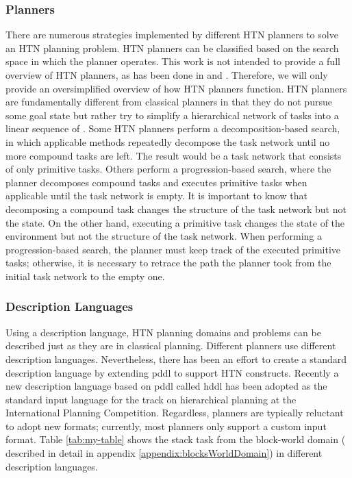 \subsubsection{Planners}
There are numerous strategies implemented by different HTN planners to solve an HTN planning problem. HTN planners can be classified based on the search space in which the planner operates. This work is not intended to provide a full overview of HTN planners, as has been done in \cite{bercher_survey_2019} and \cite{OverviewHierarchicalTaskgeorgievski2014}. Therefore, we will only provide an oversimplified overview of how HTN planners function. HTN planners are fundamentally different from classical planners in that they do not pursue some goal state but rather try to simplify a hierarchical network of tasks into a linear sequence of . Some HTN planners perform a decomposition-based search, in which applicable methods repeatedly decompose the task network until no more compound tasks are left. The result would be a task network that consists of only primitive tasks. Others perform a progression-based search, where the planner decomposes compound tasks and executes primitive tasks when applicable until the task network is empty. It is important to know that decomposing a compound task changes the structure of the task network but not the state. On the other hand, executing a primitive task changes the state of the environment but not the structure of the task network. When performing a progression-based search, the planner must keep track of the executed primitive tasks; otherwise, it is necessary to retrace the path the planner took from the initial task network to the empty one.

\subsubsection{Description Languages}
Using a description language, HTN planning domains and problems can be described just as they are in classical planning. Different planners use different description languages. Nevertheless, there has been an effort to create a standard description language by extending \gls{pddl} to support HTN constructs. Recently a new description language based on \gls{pddl} called \gls{hddl} has been adopted as the standard input language for the track on hierarchical planning at the International Planning Competition. Regardless, planners are typically reluctant to adopt new formats; currently, most planners only support a custom input format.
Table \ref{tab:my-table} shows the stack task from the block-world domain ( described in detail in appendix \ref{appendix:blocksWorldDomain}) in different description languages.

